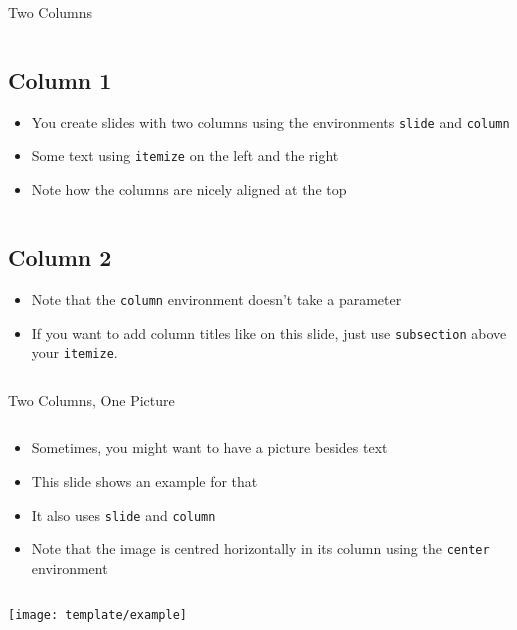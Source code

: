\documentclass{rhsleek}
\begin{document}
\begin{slide}{Two Columns}
	\begin{column}
		\subsection{Column 1}
		\begin{itemize}
			\item You create slides with two columns using the environments \texttt{slide} and \texttt{column}
			\item Some text using \texttt{itemize} on the left and the right
			\item Note how the columns are nicely aligned at the top
		\end{itemize}
	\end{column}
	\begin{column}
		\subsection{Column 2}
		\begin{itemize}
			\item Note that the \texttt{column} environment doesn't take a parameter
			\item If you want to add column titles like on this slide, just use \texttt{subsection} above your \texttt{itemize}.
		\end{itemize}	
	\end{column}
\end{slide}

\begin{slide}{Two Columns, One Picture}
	\begin{column}
		\begin{itemize}
			\item Sometimes, you might want to have a picture besides text
			\item This slide shows an example for that
			\item It also uses \texttt{slide} and \texttt{column}
			\item Note that the image is centred horizontally in its column using the \texttt{center} environment
		\end{itemize}
	\end{column}
	\begin{column}
		\begin{center}
			\texttt{[image: template/example]}
		\end{center}
	\end{column}
\end{slide}
\end{document}
